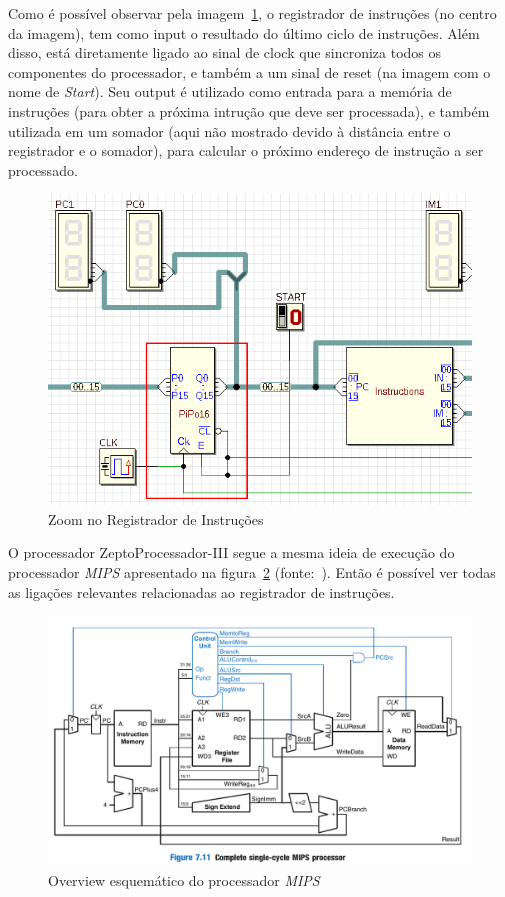 \documentclass[12pt]{article}
\begin{document}
Como é possível observar pela
imagem~\ref{fig:circuit__instruction_register.png}, o registrador de instruções
(no centro da imagem), tem como input o resultado do último ciclo de instruções.
Além disso, está diretamente ligado ao sinal de clock que sincroniza todos os
componentes do processador, e também a um sinal de reset (na imagem com o nome
de \emph{Start}). Seu output é utilizado como entrada para a memória de
instruções (para obter a próxima intrução que deve ser processada), e também
utilizada em um somador (aqui não mostrado devido à distância entre o
registrador e o somador), para calcular o próximo endereço de instrução a ser
processado.

\begin{figure}[H]
    \centering
    \includegraphics[width=.9\textwidth]{Projeto/images/circuit__instruction_register.png}
    \caption{Zoom no Registrador de Instruções}\label{fig:circuit__instruction_register.png}
\end{figure}

O processador ZeptoProcessador-III segue a mesma ideia de execução do
processador \emph{MIPS} apresentado na figura~\ref{fig:circuit__MIPS.png}
(fonte:~\cite{Digital_Design}). Então é possível ver todas as ligações
relevantes relacionadas ao registrador de instruções.

\begin{figure}[H]
    \centering
    \includegraphics[width=.9\textwidth]{Projeto/images/circuit__MIPS.png}
    \caption{Overview esquemático do processador \emph{MIPS}}\label{fig:circuit__MIPS.png}
\end{figure}
\end{document}
